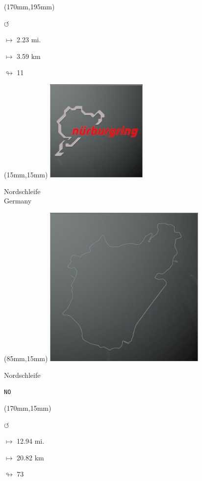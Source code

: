 \begin{textblock*}{30mm}(170mm,195mm)%
\par \Huge$\circlearrowleft$
\Large
\par$\mapsto$ 2.23 mi.
\par$\mapsto$ 3.59 km
\par$\looparrowright$ 11
\end{textblock*}
\null\newpage

\begin{textblock*}{60mm}(15mm,15mm)%
\includegraphics[width=50mm]{LG/2015-05-20_00088.png}
\par Nordschleife\\ Germany
\end{textblock*}
\begin{textblock*}{80mm}(85mm,15mm)%
\includegraphics[width=80mm]{TR/2015-05-20_00037.png}
\centerline{Nordschleife}
\par\hfill\tiny\tt NO\\
\end{textblock*}
\begin{textblock*}{30mm}(170mm,15mm)%
\par \Huge$\circlearrowleft$
\Large
\par$\mapsto$ 12.94 mi.
\par$\mapsto$ 20.82 km
\par$\looparrowright$ 73
\end{textblock*}
